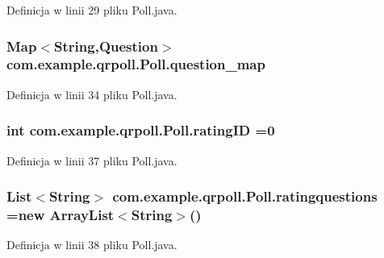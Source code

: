 Definicja w linii 29 pliku Poll.\+java.

\hypertarget{classcom_1_1example_1_1qrpoll_1_1_poll_ac4019650bac8ecbf279808dc4d4dae9b}{
\subsubsection[{question\+\_\+map}]{\setlength{\rightskip}{0pt plus 5cm}Map$<$String,{\bf Question}$>$ com.\+example.\+qrpoll.\+Poll.\+question\+\_\+map\hspace{0.3cm}{\ttfamily [private]}}}\label{classcom_1_1example_1_1qrpoll_1_1_poll_ac4019650bac8ecbf279808dc4d4dae9b}


Definicja w linii 34 pliku Poll.\+java.

\hypertarget{classcom_1_1example_1_1qrpoll_1_1_poll_a41aee71def14cf65836f768222a32ba3}{
\subsubsection[{rating\+I\+D}]{\setlength{\rightskip}{0pt plus 5cm}int com.\+example.\+qrpoll.\+Poll.\+rating\+I\+D =0}}\label{classcom_1_1example_1_1qrpoll_1_1_poll_a41aee71def14cf65836f768222a32ba3}


Definicja w linii 37 pliku Poll.\+java.

\hypertarget{classcom_1_1example_1_1qrpoll_1_1_poll_a357dc2acb9f42f2bee8dd88556551637}{
\subsubsection[{ratingquestions}]{\setlength{\rightskip}{0pt plus 5cm}List$<$String$>$ com.\+example.\+qrpoll.\+Poll.\+ratingquestions =new Array\+List$<$String$>$()}}\label{classcom_1_1example_1_1qrpoll_1_1_poll_a357dc2acb9f42f2bee8dd88556551637}


Definicja w linii 38 pliku Poll.\+java.

